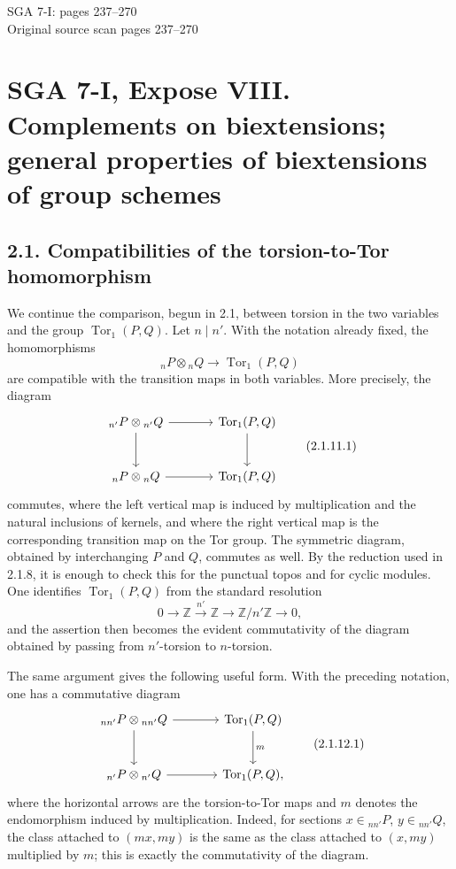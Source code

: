 \documentclass[11pt]{article}
\providecommand{\Tor}{\operatorname{Tor}}
\providecommand{\Z}{\mathbb Z}
\providecommand{\Tor}{\operatorname{Tor}}
\providecommand{\Z}{\mathbb Z}
\begin{document}
\begin{center}
{\Large SGA 7-I: pages 237--270}\\[0.35em]
{\large Original source scan pages 237--270}
\end{center}


\section*{SGA 7-I, Expose VIII. Complements on biextensions; general properties of biextensions of group schemes}
\subsection*{2.1. Compatibilities of the torsion-to-Tor homomorphism}

We continue the comparison, begun in 2.1, between torsion in the two variables and the group
\(\Tor_1(P,Q)\).  Let \(n\mid n'\).  With the notation already fixed, the homomorphisms
\[
        {}_nP\otimes {}_nQ\longrightarrow \Tor_1(P,Q)
\]
are compatible with the transition maps in both variables.  More precisely, the diagram
\[
\begin{tikzcd}[column sep=large,row sep=large]
 {}_{n'}P\otimes {}_{n'}Q \arrow[r]\arrow[d] & \Tor_1(P,Q)\arrow[d]\\
 {}_{n}P\otimes {}_{n}Q \arrow[r] & \Tor_1(P,Q)
\end{tikzcd}
\qquad\text{(2.1.11.1)}
\]
commutes, where the left vertical map is induced by multiplication and the natural inclusions of kernels, and where the right vertical map is the corresponding transition map on the Tor group.  The symmetric diagram, obtained by interchanging \(P\) and \(Q\), commutes as well.  By the reduction used in 2.1.8, it is enough to check this for the punctual topos and for cyclic modules.  One identifies \(\Tor_1(P,Q)\) from the standard resolution
\[
        0\longrightarrow \Z\xrightarrow{n'}\Z\longrightarrow \Z/n'\Z\longrightarrow 0,
\]
and the assertion then becomes the evident commutativity of the diagram obtained by passing from \(n'\)-torsion to \(n\)-torsion.

The same argument gives the following useful form.  With the preceding notation, one has a commutative diagram
\[
\begin{tikzcd}[column sep=large,row sep=large]
 {}_{nn'}P\otimes {}_{nn'}Q \arrow[r]\arrow[d] & \Tor_1(P,Q)\arrow[d,"m"]\\
 {}_{n'}P\otimes {}_{n'}Q \arrow[r] & \Tor_1(P,Q),
\end{tikzcd}
\qquad\text{(2.1.12.1)}
\]
where the horizontal arrows are the torsion-to-Tor maps and \(m\) denotes the endomorphism induced by multiplication.  Indeed, for sections \(x\in {}_{nn'}P\), \(y\in {}_{nn'}Q\), the class attached to \((mx,my)\) is the same as the class attached to \((x,my)\) multiplied by \(m\); this is exactly the commutativity of the diagram.
\end{document}

